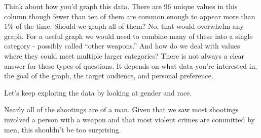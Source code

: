 \documentclass[
  12pt,
]{book}
\newenvironment{Shaded}{\begin{snugshade}}{\end{snugshade}}
\newcommand{\CommentTok}[1]{\textcolor[rgb]{0.37,0.37,0.37}{\textit{#1}}}
\newcommand{\DataTypeTok}[1]{\textcolor[rgb]{0.27,0.27,0.27}{#1}}
\newcommand{\DecValTok}[1]{\textcolor[rgb]{0.06,0.06,0.06}{#1}}
\newcommand{\KeywordTok}[1]{\textcolor[rgb]{0.27,0.27,0.27}{\textbf{#1}}}
\newcommand{\NormalTok}[1]{#1}
\newcommand{\OperatorTok}[1]{\textcolor[rgb]{0.43,0.43,0.43}{\textbf{#1}}}
\newcommand{\StringTok}[1]{\textcolor[rgb]{0.5,0.5,0.5}{#1}}
\begin{document}
Think about how you'd graph this data. There are 96 unique values in this column though fewer than ten of them are common enough to appear more than 1\% of the time. Should we graph all of them? No, that would overwhelm any graph. For a useful graph we would need to combine many of these into a single category - possibly called ``other weapons.'' And how do we deal with values where they could meet multiple larger categories? There is not always a clear answer for these types of questions. It depends on what data you're interested in, the goal of the graph, the target audience, and personal preference.

Let's keep exploring the data by looking at gender and race.

\begin{Shaded}
\end{Shaded}

Nearly all of the shootings are of a man. Given that we saw most shootings involved a person with a weapon and that most violent crimes are committed by men, this shouldn't be too surprising.

\begin{Shaded}
\end{Shaded}
\end{document}

